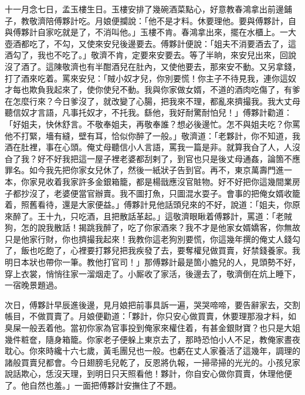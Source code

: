 十一月念七日，孟玉樓生日。玉樓安排了幾碗酒菜點心，好意教春鴻拿出前邊鋪子，教敬濟陪傅夥計吃。月娘便攔說：「他不是才料。休要理他。{}要與傅夥計，自與傅夥計自家吃就是了，不消叫他。」玉樓不肯。{}春鴻拿出來，擺在水櫃上。一大壺酒都吃了，不勾，又使來安兒後邊要去。傅夥計便說：「姐夫不消要酒去了，這酒勾了，我也不吃了。」敬濟不肯，定要來安要去。等了半晌，來安兒出來，回說沒了酒了。這陳敬濟也有半酣酒兒在肚內，又使他要去，那來安不動。又另拿錢，打了酒來吃着。罵來安兒：「賊小奴才兒，你別要慌！你主子不待見我，連你這奴才每也欺負我起來了，使你使兒不動。我與你家做女婿，不道的酒肉吃傷了，有爹在怎麼行來？今日爹沒了，就改變了心腸，把我來不理，都亂來擠撮我。我大丈母聽信奴才言語，凡事托奴才，不托我。繇他，我好耐驚耐怕兒！」傅夥計勸道：「好姐夫，快休舒言。不敬奉姐夫，再敬奉誰？想必後邊忙。怎不與姐夫吃？你罵他不打緊，墻有縫，壁有耳，恰似你醉了一般。」敬濟道：「老夥計，你不知道，我酒在肚裡，事在心頭。俺丈母聽信小人言語，罵我一篇是非。就算我㒲了人，人沒㒲了我？好不好我把這一屋子裡老婆都刮剌了，到官也只是後丈母通姦，論箇不應罪名。如今我先把你家女兒休了，然後一紙狀子告到官。再不，東京萬壽門進一本，你家見收着我家許多金銀箱籠，都是楊戩應沒官賍物。好不好把你這幾間業房子都抄沒了，老婆便當官辦賣。我不圖打魚，只圖混水耍子。{}會事的把俺女婿收籠着，照舊看待，還是大家便益。」傅夥計見他話頭兒來的不好，說道：「姐夫，你原來醉了。王十九，只吃酒，且把散話革起。」這敬濟眼瞅着傅夥計，罵道：「老賊狗，怎的說我散話！揭跳我醉了，吃了你家酒來？我不才是他家女婿嬌客，你無故只是他家行財，你也擠撮我起來！我教你這老狗別要慌，你這幾年撰的俺丈人錢勾了，飯也吃飽了，心裡要打夥兒把我疾發了去，要奪權兒做買賣，好禁錢養家。{}我明日本狀也帶你一筆。教他打官司！」{}那傅夥計最是箇小膽兒的人，見頭勢不好，穿上衣裳，悄悄往家一溜烟走了。小厮收了家活，後邊去了，敬濟倒在炕上睡下，一宿晚景題過。

次日，傅夥計早辰進後邊，見月娘把前事具訴一遍，哭哭啼啼，要告辭家去，交割帳目，不做買賣了。月娘便勸道：「夥計，你只安心做買賣，休要理那潑才料，如臭屎一般丟着他。當初你家為官事投到俺家來權住着，{}有甚金銀財寶？也只是大姐幾件粧奩，隨身箱籠。你家老子便躲上東京去了，那時恐怕小人不足，教俺家晝夜耽心。你來時纔十六七歲，黃毛團兒也一般。也虧在丈人家養活了這幾年，調理的諸般買賣兒都會。今日翅膀毛兒乾了，反恩將仇報，一掃帚掃的光光的。小孩兒家說話欺心，恁沒天理，到明日只天照看他！夥計，你自安心做你買賣，休理他便了。他自然也羞。」一面把傅夥計安撫住了不題。

